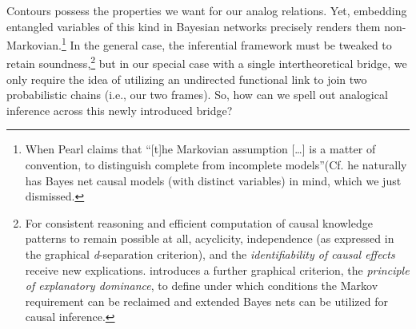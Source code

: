 \documentclass[11pt, oneside]{article}   	%
\begin{document}
Contours possess the properties we want for our analog relations. Yet, embedding entangled variables of this kind in Bayesian networks precisely renders them non-Markovian.\footnote{When Pearl claims that ``[t]he Markovian assumption [\dots] is a matter of convention, to distinguish complete from incomplete models''(Cf. \citep[p. 61]{Pearl2000} he naturally has Bayes net causal models (with distinct variables) in mind, which we just dismissed.} In the general case, the inferential framework must be tweaked to retain soundness,\footnote{For consistent reasoning and efficient computation of causal knowledge patterns to remain possible at all, acyclicity, independence (as expressed in the graphical \emph{d}-separation criterion), and the \emph{identifiability of causal effects} receive new explications. \cite{Poellinger2012} introduces a further graphical criterion, the \emph{principle of explanatory dominance}, to define under which conditions the Markov requirement can be reclaimed and extended Bayes nets can be utilized for causal inference.  
} but in our special case with a single intertheoretical bridge, we only require the idea of utilizing an undirected functional link to join two probabilistic chains (i.e., our two frames). So, how can we spell out analogical inference across this newly introduced bridge?





\end{document}
